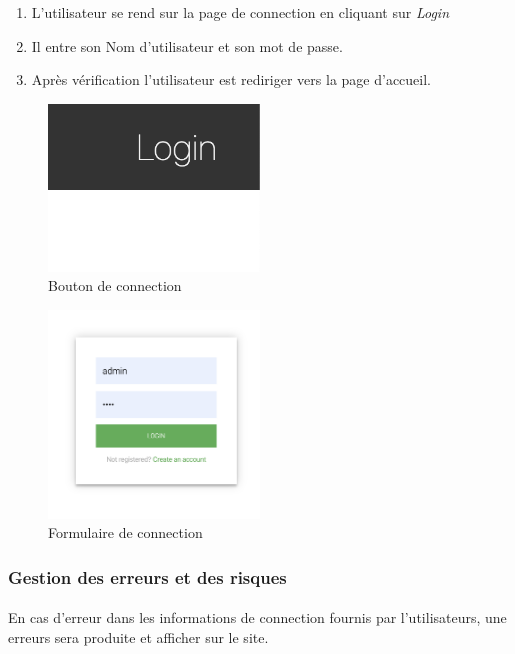 \begin{enumerate}
	\item L'utilisateur se rend sur la page de connection en cliquant sur \textit{Login}
	\item Il entre son Nom d'utilisateur et son mot de passe.
	\item Après vérification l'utilisateur est rediriger vers la page d'accueil. 
\end{enumerate}

\begin{figure}[h!]
	\includegraphics[width = 0.5\textwidth,center]{Figures/us0-1}
	\caption{Bouton de connection}
\end{figure}

\begin{figure}[h!]
	\includegraphics[width = 0.5\textwidth,center]{Figures/us0-2}
	\caption{Formulaire de connection}
\end{figure}

\subsubsection{Gestion des erreurs et des risques}
	\paragraph{}
		En cas d'erreur dans les informations de connection fournis par l'utilisateurs, une erreurs sera produite et afficher sur le site.
		
